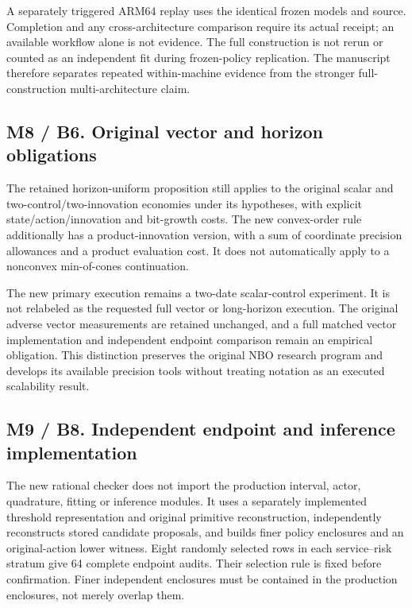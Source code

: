 A separately triggered ARM64 replay uses the identical frozen models and
source. Completion and any cross-architecture comparison require its
actual receipt; an available workflow alone is not evidence. The full
construction is not rerun or counted as an independent fit during
frozen-policy replication. The manuscript therefore separates repeated
within-machine evidence from the stronger full-construction
multi-architecture claim.

\hypertarget{m8-b6.-original-vector-and-horizon-obligations}{%
\subsection{M8 / B6. Original vector and horizon
obligations}\label{m8-b6.-original-vector-and-horizon-obligations}}

The retained horizon-uniform proposition still applies to the original
scalar and two-control/two-innovation economies under its hypotheses,
with explicit state/action/innovation and bit-growth costs. The new
convex-order rule additionally has a product-innovation version, with a
sum of coordinate precision allowances and a product evaluation cost. It
does not automatically apply to a nonconvex min-of-cones continuation.

The new primary execution remains a two-date scalar-control experiment.
It is not relabeled as the requested full vector or long-horizon
execution. The original adverse vector measurements are retained
unchanged, and a full matched vector implementation and independent
endpoint comparison remain an empirical obligation. This distinction
preserves the original NBO research program and develops its available
precision tools without treating notation as an executed scalability
result.

\hypertarget{m9-b8.-independent-endpoint-and-inference-implementation}{%
\subsection{M9 / B8. Independent endpoint and inference
implementation}\label{m9-b8.-independent-endpoint-and-inference-implementation}}

The new rational checker does not import the production interval, actor,
quadrature, fitting or inference modules. It uses a separately
implemented threshold representation and original primitive
reconstruction, independently reconstructs stored candidate proposals,
and builds finer policy enclosures and an original-action lower witness.
Eight randomly selected rows in each service--risk stratum give 64
complete endpoint audits. Their selection rule is fixed before
confirmation. Finer independent enclosures must be contained in the
production enclosures, not merely overlap them.

